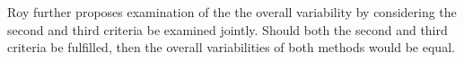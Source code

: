 \documentclass[12pt, a4paper]{report}
\theoremstyle{plain}
\theoremstyle{definition}
\theoremstyle{remark}
\begin{document}
Roy further proposes examination of the the overall variability by considering the second and third criteria be examined jointly. Should both the second and third criteria be fulfilled, then the overall variabilities of both methods would be equal.	

	
	

	
%	

	

%	
%	

	
	
\end{document}
